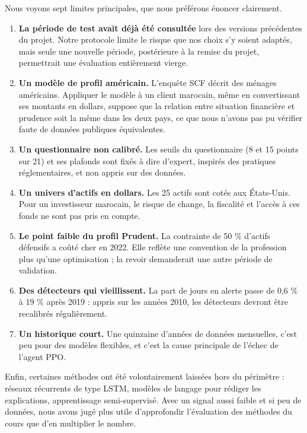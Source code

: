 Nous voyons sept limites principales, que nous préférons énoncer clairement.
\begin{enumerate}
  \item \textbf{La période de test avait déjà été consultée} lors des versions précédentes du projet. Notre protocole limite le risque que nos choix s'y soient adaptés, mais seule une nouvelle période, postérieure à la remise du projet, permettrait une évaluation entièrement vierge.
  \item \textbf{Un modèle de profil américain.} L'enquête SCF décrit des ménages américains. Appliquer le modèle à un client marocain, même en convertissant ses montants en dollars, suppose que la relation entre situation financière et prudence soit la même dans les deux pays, ce que nous n'avons pas pu vérifier faute de données publiques équivalentes.
  \item \textbf{Un questionnaire non calibré.} Les seuils du questionnaire (8 et 15 points sur 21) et ses plafonds sont fixés à dire d'expert, inspirés des pratiques réglementaires, et non appris sur des données.
  \item \textbf{Un univers d'actifs en dollars.} Les 25 actifs sont cotés aux États-Unis. Pour un investisseur marocain, le risque de change, la fiscalité et l'accès à ces fonds ne sont pas pris en compte.
  \item \textbf{Le point faible du profil Prudent.} La contrainte de 50 \% d'actifs défensifs a coûté cher en 2022. Elle reflète une convention de la profession plus qu'une optimisation ; la revoir demanderait une autre période de validation.
  \item \textbf{Des détecteurs qui vieillissent.} La part de jours en alerte passe de 0,6 \% à 19 \% après 2019 : appris sur les années 2010, les détecteurs devront être recalibrés régulièrement.
  \item \textbf{Un historique court.} Une quinzaine d'années de données mensuelles, c'est peu pour des modèles flexibles, et c'est la cause principale de l'échec de l'agent PPO.
\end{enumerate}
Enfin, certaines méthodes ont été volontairement laissées hors du périmètre : réseaux récurrents de type LSTM, modèles de langage pour rédiger les explications, apprentissage semi-supervisé. Avec un signal aussi faible et si peu de données, nous avons jugé plus utile d'approfondir l'évaluation des méthodes du cours que d'en multiplier le nombre.
